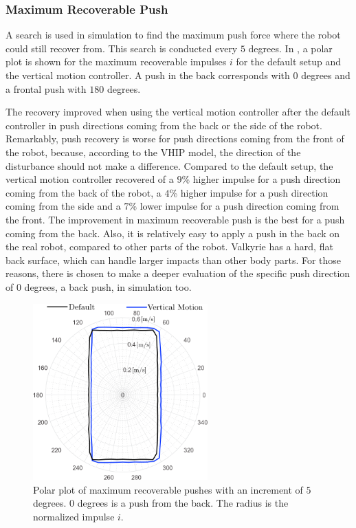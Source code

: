 \subsubsection{Maximum Recoverable Push} 
A search is used in simulation to find the maximum push force where the robot could still recover from. This search is conducted every $5$ degrees.  In , a polar plot is shown for the maximum recoverable impulses $i$ for the default setup and the vertical motion controller. A push in the back corresponds with $0$ degrees and a frontal push with $180$ degrees.

The recovery improved when using the vertical motion controller after the default controller in push directions coming from the back or the side of the robot. Remarkably, push recovery is worse for push directions coming from the front of the robot, because, according to the \ac{VHIP} model, the direction of the disturbance should not make a difference. Compared to the default setup, the vertical motion controller recovered of a $9$\% higher impulse for a push direction coming from the back of the robot, a $4$\% higher impulse for a push direction coming from the side and a $7$\% lower impulse for a push direction coming from the front. The improvement in maximum recoverable push is the best for a push coming from the back. Also, it is relatively easy to apply a push in the back on the real robot, compared to other parts of the robot. Valkyrie has a hard, flat back surface, which can handle larger impacts than other body parts. For those reasons, there is chosen to make a deeper evaluation of the specific push direction of $0$ degrees, a back push, in simulation too.
\begin{figure}
\centering
\includegraphics[width=0.6\textwidth]{STYLESTUFF/roundStanding.png}
\caption{Polar plot of maximum recoverable pushes with an increment of $5$ degrees. $0$ degrees is a push from the back. The radius is the normalized impulse $i$. }
\label{fig:roundStanding}
\end{figure}

